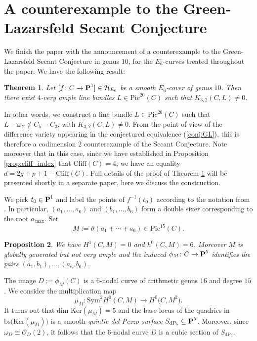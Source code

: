 \documentclass[11pt]{amsart}
\newtheorem{theorem}{Theorem}[section]
\newtheorem{proposition}[theorem]{Proposition}
\theoremstyle{definition}
\def\PP{{\textbf P}}
\def\OO{\mathcal{O}}
\def\cH{\mathcal{H}}
\begin{document}
\section{A counterexample to the Green-Lazarsfeld Secant Conjecture}

We finish the paper with the announcement of a counterexample to the Green-Lazarsfeld Secant Conjecture \cite{GL} in genus $10$, for the $E_6$-curves treated throughout the paper. We have the following result:

\begin{theorem}\label{thm:gl}
Let $[f\colon C\rightarrow \PP^1]\in \cH_{E_6}$ be a smooth $E_6$-cover of genus $10$. Then there exist $4$-very ample line bundles $L\in\mathrm{Pic}^{20}(C)$ such that $K_{3,2}(C,L)\neq 0$.
\end{theorem}

In other words, we construct a line bundle $L\in \mbox{Pic}^{20}(C)$ such that $L-\omega_C\notin C_5-C_3$, with $K_{3,2}(C,L)\neq 0$. From the point of view of the difference variety appearing in the conjectured equivalence (\ref{conj:GL}), this is therefore a codimension $2$ counterexample of the Secant Conjecture. Note moreover that in this case, since we have established in Proposition \ref{prop:cliff_index} that $\mbox{Cliff}(C)=4$, we have an equality $d=2g+p+1-\mbox{Cliff}(C)$. Full details of the proof of Theorem \ref{thm:gl} will be presented shortly in a separate paper, here we discuss the construction.

\vskip 4pt

We pick $t_0\in \PP^1$ and label the points of $f^{-1}(t_0)$ according to the notation from \cite{Dol}. In particular, $(a_1, \ldots, a_6)$ and $(b_1, \ldots, b_6)$ form a double sixer corresponding to the root $\alpha_{\mathrm{max}}$. Set 
$$M:=\vartheta(a_1+\cdots+a_6)\in \mbox{Pic}^{15}(C).$$\begin{proposition}\label{prop:M}
We have $H^1(C,M)=0$ and $h^0(C,M)=6$. Moreover $M$ is globally generated but not very ample and the induced $\phi_M\colon C\rightarrow \PP^5$ identifies the pairs $(a_1, b_1), \ldots, (a_6, b_6)$.
\end{proposition}

The image $D:=\phi_M(C)$ is a $6$-nodal curve of arithmetic genus $16$ and degree $15$. We consider the multiplication map 
$$
\mu_M \colon \mbox{Sym}^2 H^0(C,M)\longrightarrow H^0\bigl(C,M^{2}\bigr).
$$
It turns out that $\mbox{dim } \mbox{Ker}(\mu_M)=5$ and the base locus of the quadrics in $\mathrm{bs}\bigl(\mbox{Ker}(\mu_M)\bigr)$ is a smooth \emph{quintic del Pezzo surface} $S_{\mathrm{dP}_5}\subseteq \PP^5$. Moreover, since $\omega_D\cong \OO_D(2)$, it follows that the $6$-nodal curve $D$ is a cubic section of $S_{\mathrm{dP}_5}$.
\end{document}
